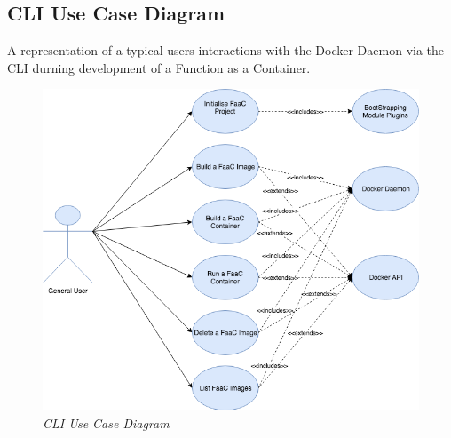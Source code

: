 \subsection{CLI Use Case Diagram}
A representation of a typical users interactions with the Docker Daemon via the \gls{CLI} durning development of a Function as a Container.
\label{sub:usecase}
\begin{figure}[!ht]
\centering
\includegraphics*[width=1\textwidth]{images/cli-use-case.png}
\caption{\em CLI Use Case Diagram}
\label{img:cli_seq7}
\end{figure}
